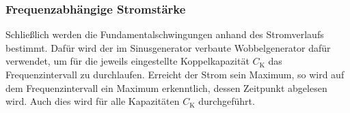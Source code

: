 \subsubsection*{Frequenzabhängige Stromstärke}
 
Schließlich werden die Fundamentalschwingungen anhand des Stromverlaufs bestimmt. 
Dafür wird der im Sinusgenerator verbaute Wobbelgenerator dafür verwendet, um für die jeweils eingestellte
Koppelkapazität $C_{\text{K}}$ das Frequenzintervall zu durchlaufen. 
Erreicht der Strom sein Maximum, so wird auf dem Frequenzintervall ein Maximum erkenntlich, dessen Zeitpunkt abgelesen wird.
Auch dies wird für alle Kapazitäten $C_{\text{K}}$ durchgeführt.







